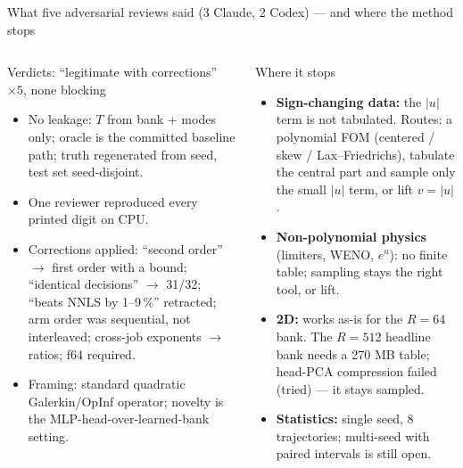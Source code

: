 \documentclass[10pt,aspectratio=169]{beamer}
\begin{document}
\begin{frame}{What five adversarial reviews said (3 Claude, 2 Codex) --- and where the method stops}
  \begin{columns}[T]
    \begin{block}{Verdicts: ``legitimate with corrections'' $\times 5$, none blocking}
      \small
      \begin{itemize}
        \item No leakage: $T$ from bank + modes only; oracle is the committed baseline path; truth regenerated from seed, test set seed-disjoint.
        \item One reviewer reproduced every printed digit on CPU.
        \item Corrections applied: ``second order'' $\to$ first order with a bound; ``identical decisions'' $\to$ 31/32; ``beats NNLS by 1--9\,\%'' retracted; arm order was sequential, not interleaved; cross-job exponents $\to$ ratios; f64 required.
        \item Framing: standard quadratic Galerkin/OpInf operator; novelty is the MLP-head-over-learned-bank setting.
      \end{itemize}
    \end{block}
    \begin{alertblock}{Where it stops}
      \small
      \begin{itemize}
        \item \textbf{Sign-changing data:} the $|u|$ term is not tabulated. Routes: a polynomial FOM (centered / skew / Lax--Friedrichs), tabulate the central part and sample only the small $|u|$ term, or lift $v=|u|$.
        \item \textbf{Non-polynomial physics} (limiters, WENO, $e^u$): no finite table; sampling stays the right tool, or lift.
        \item \textbf{2D:} works as-is for the $R=64$ bank. The $R=512$ headline bank needs a 270 MB table; head-PCA compression failed (tried) --- it stays sampled.
        \item \textbf{Statistics:} single seed, 8 trajectories; multi-seed with paired intervals is still open.
      \end{itemize}
    \end{alertblock}
  \end{columns}
\end{frame}

\end{document}
